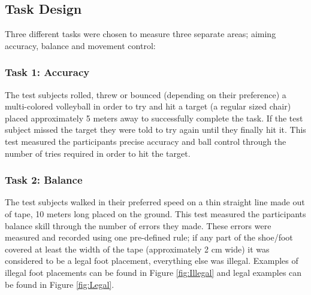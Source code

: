 \documentclass[runningheads,a4paper,oribibl]{llncs}
\begin{document}
\subsection{Task Design} \label{subsec:TaskDesign}
Three different tasks were chosen to measure three separate areas; aiming accuracy, balance and movement control:

\subsubsection{Task 1: Accuracy}

The test subjects rolled, threw or bounced (depending on their preference) a multi-colored volleyball in order to try and hit a target (a regular sized chair) placed approximately 5 meters away to successfully complete the task. If the test subject missed the target they were told to try again until they finally hit it. This test measured the participants precise accuracy and ball control through the number of tries required in order to hit the target.


\subsubsection{Task 2: Balance}

The test subjects walked in their preferred speed on a thin straight line made out of tape, 10 meters long placed on the ground. This test measured the participants balance skill through the number of errors they made. These errors were measured and recorded using one pre-defined rule; if any part of the shoe/foot covered at least the width of the tape (approximately 2 cm wide) it was considered to be a legal foot placement, everything else was illegal. Examples of illegal foot placements can be found in Figure \ref{fig:Illegal} and legal examples can be found in Figure \ref{fig:Legal}.
\end{document}
